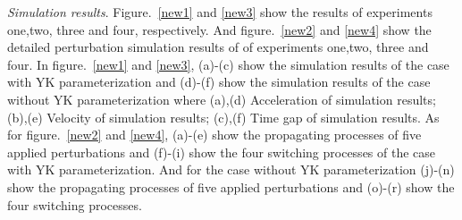 \documentclass[journal]{IEEEtran}
\begin{document}






\textit{Simulation results}. Figure.~\ref{new1} and \ref{new3} show the results of experiments one,two, three and four, respectively. And figure.~\ref{new2} and \ref{new4} show the detailed perturbation simulation results of of experiments one,two, three and four. In figure.~\ref{new1} and \ref{new3}, (a)-(c) show the simulation results of the case with YK parameterization  and (d)-(f) show the simulation results of the case without YK parameterization where (a),(d) Acceleration of simulation results; (b),(e) Velocity of simulation results; (c),(f) Time gap of simulation results. As for figure.~\ref{new2} and \ref{new4}, (a)-(e) show the propagating processes of five applied perturbations and (f)-(i) show the four switching processes of the case with YK parameterization. And for the case without YK parameterization (j)-(n) show the propagating processes of five applied perturbations and (o)-(r) show the four switching processes.
\end{document}
